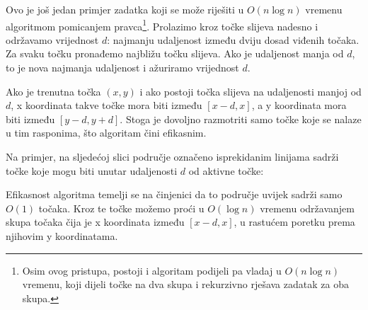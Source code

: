 Ovo je još jedan primjer zadatka
koji se može riješiti u $O(n \log n)$ vremenu
algoritmom pomicanjem pravca\footnote{Osim ovog pristupa,
postoji i
algoritam podijeli pa vladaj \cite{sha75} u $O(n \log n)$ vremenu,
koji dijeli točke na dva skupa i rekurzivno
rješava zadatak za oba skupa.}.
Prolazimo kroz točke slijeva nadesno
i održavamo vrijednost $d$: najmanju udaljenost
između dviju dosad viđenih točaka.
Za svaku točku pronađemo najbližu točku slijeva.
Ako je udaljenost manja od $d$, to je
nova najmanja udaljenost i ažuriramo
vrijednost $d$.

Ako je trenutna točka $(x,y)$
i ako postoji točka slijeva
na udaljenosti manjoj od $d$,
x koordinata takve točke mora
biti između $[x-d,x]$, a y koordinata
mora biti između $[y-d,y+d]$.
Stoga je dovoljno razmotriti samo točke
koje se nalaze u tim rasponima,
što algoritam čini efikasnim.

Na primjer, na sljedećoj slici područje
označeno isprekidanim linijama sadrži
točke koje mogu biti unutar udaljenosti $d$
od aktivne točke:

\begin{center}
\end{center}

Efikasnost algoritma temelji se na činjenici
da to područje uvijek sadrži
samo $O(1)$ točaka.
Kroz te točke možemo proći u $O(\log n)$ vremenu
održavanjem skupa točaka čija je x koordinata
između $[x-d,x]$, u rastućem poretku prema
njihovim y koordinatama.

